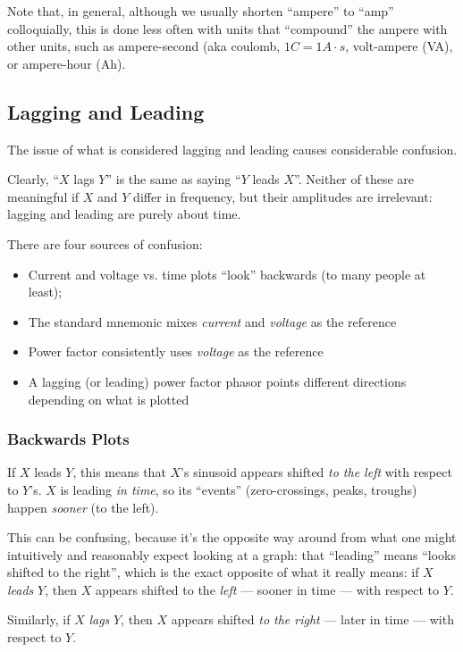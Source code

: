 \documentclass[11pt]{article}
\begin{document}
Note that, in general, although we usually shorten ``ampere'' to
``amp'' colloquially, this is done less often with units that
``compound'' the ampere with other units, such as ampere-second (aka
coulomb, $1\unit{C}=1\unit{A\cdot s}$, volt-ampere (\unit{VA}), or
ampere-hour (\unit{Ah}).


\subsection{Lagging and Leading}

The issue of what is considered lagging and leading causes
considerable confusion.

Clearly, ``$X$ lags $Y$'' is the same as saying ``$Y$ leads
$X$''. Neither of these are meaningful if $X$ and $Y$ differ in
frequency, but their amplitudes are irrelevant: lagging and leading
are purely about time.

There are four sources of confusion:
\begin{itemize}
  \item Current and voltage vs. time plots ``look'' backwards (to many people at least);
  \item The standard mnemonic mixes \emph{current} and \emph{voltage} as the reference
  \item Power factor consistently uses \emph{voltage} as the reference
  \item A lagging (or leading) power factor phasor points different
    directions depending on what is plotted
\end{itemize}

\subsubsection{Backwards Plots}

If $X$ leads $Y$, this means that $X$'s sinusoid appears shifted
\emph{to the left} with respect to $Y$'s. $X$ is leading \emph{in
  time}, so its ``events'' (zero-crossings, peaks, troughs) happen
\emph{sooner} (to the left).

This can be confusing, because it's the opposite way around from what
one might intuitively and reasonably expect looking at a graph: that
``leading'' means ``looks shifted to the right'', which is the exact
opposite of what it really means: if $X$ \emph{leads} $Y$, then $X$
appears shifted to the \emph{left} --- sooner in time --- with respect
to $Y$.

Similarly, if $X$ \emph{lags} $Y$, then $X$ appears shifted \emph{to
  the right} --- later in time --- with respect to $Y$.
\end{document}
